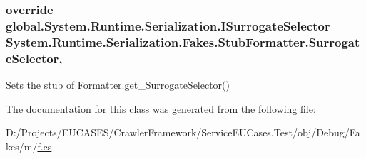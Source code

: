 \hypertarget{class_system_1_1_runtime_1_1_serialization_1_1_fakes_1_1_stub_formatter_a978926d95f9d6b924264103603c07324}{
\subsubsection[{Surrogate\-Selector}]{\setlength{\rightskip}{0pt plus 5cm}override global.\-System.\-Runtime.\-Serialization.\-I\-Surrogate\-Selector System.\-Runtime.\-Serialization.\-Fakes.\-Stub\-Formatter.\-Surrogate\-Selector\hspace{0.3cm}{\ttfamily [get]}, {\ttfamily [set]}}}\label{class_system_1_1_runtime_1_1_serialization_1_1_fakes_1_1_stub_formatter_a978926d95f9d6b924264103603c07324}


Sets the stub of Formatter.\-get\-\_\-\-Surrogate\-Selector()



The documentation for this class was generated from the following file\-:\begin{DoxyCompactItemize}
\item 
D\-:/\-Projects/\-E\-U\-C\-A\-S\-E\-S/\-Crawler\-Framework/\-Service\-E\-U\-Cases.\-Test/obj/\-Debug/\-Fakes/m/\hyperlink{m_2f_8cs}{f.\-cs}\end{DoxyCompactItemize}
